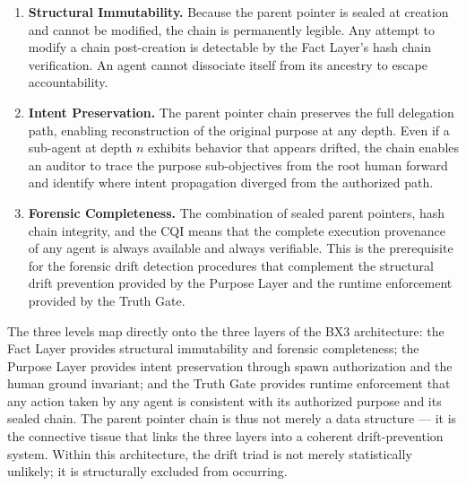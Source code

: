 \begin{enumerate}
    \item \textbf{Structural Immutability.} Because the parent pointer is sealed at creation and cannot be modified, the chain is permanently legible. Any attempt to modify a chain post-creation is detectable by the Fact Layer's hash chain verification. An agent cannot dissociate itself from its ancestry to escape accountability.

    \item \textbf{Intent Preservation.} The parent pointer chain preserves the full delegation path, enabling reconstruction of the original purpose at any depth. Even if a sub-agent at depth $n$ exhibits behavior that appears drifted, the chain enables an auditor to trace the purpose sub-objectives from the root human forward and identify where intent propagation diverged from the authorized path.

    \item \textbf{Forensic Completeness.} The combination of sealed parent pointers, hash chain integrity, and the CQI means that the complete execution provenance of any agent is always available and always verifiable. This is the prerequisite for the forensic drift detection procedures that complement the structural drift prevention provided by the Purpose Layer and the runtime enforcement provided by the Truth Gate.
\end{enumerate}

The three levels map directly onto the three layers of the BX3 architecture: the Fact Layer provides structural immutability and forensic completeness; the Purpose Layer provides intent preservation through spawn authorization and the human ground invariant; and the Truth Gate provides runtime enforcement that any action taken by any agent is consistent with its authorized purpose and its sealed chain. The parent pointer chain is thus not merely a data structure — it is the connective tissue that links the three layers into a coherent drift-prevention system. Within this architecture, the drift triad is not merely statistically unlikely; it is structurally excluded from occurring.
